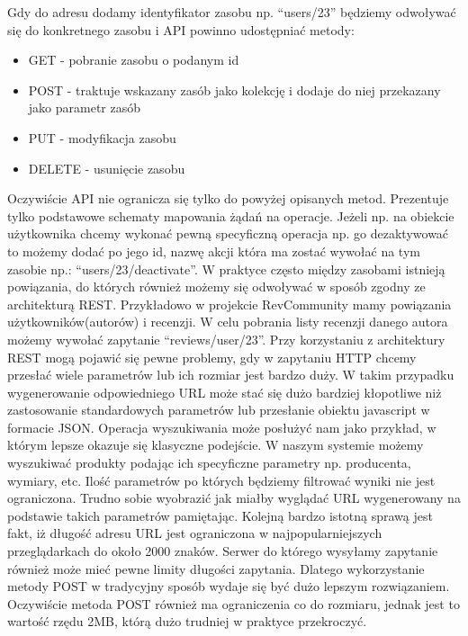 Gdy do adresu dodamy identyfikator zasobu np. “users/23” będziemy odwoływać się do konkretnego zasobu i API powinno udostępniać metody:

\begin{itemize}
\item GET - pobranie zasobu o podanym id
\item POST - traktuje wskazany zasób jako kolekcję i dodaje do niej przekazany jako parametr zasób
\item PUT - modyfikacja zasobu
\item DELETE - usunięcie zasobu
\end{itemize}

Oczywiście API nie ogranicza się tylko do powyżej opisanych metod. Prezentuje tylko podstawowe schematy mapowania żądań na operacje. Jeżeli np. na obiekcie użytkownika chcemy wykonać pewną specyficzną operacja np. go dezaktywować to możemy dodać po jego id, nazwę akcji która ma zostać wywołać na tym zasobie np.: “users/23/deactivate”. 
W praktyce często między zasobami istnieją powiązania, do których również możemy się odwoływać w sposób zgodny ze architekturą REST. Przykładowo w projekcie RevCommunity mamy powiązania użytkowników(autorów) i recenzji. W celu pobrania listy recenzji danego autora możemy wywołać zapytanie “reviews/user/23”.
Przy korzystaniu z architektury REST mogą pojawić się pewne problemy, gdy w zapytaniu HTTP chcemy przesłać wiele parametrów lub ich rozmiar jest bardzo duży. W takim przypadku wygenerowanie odpowiedniego URL może stać się dużo bardziej kłopotliwe niż zastosowanie standardowych parametrów lub przesłanie obiektu javascript w formacie JSON. Operacja wyszukiwania może posłużyć nam jako przykład, w którym lepsze okazuje się klasyczne podejście. W naszym systemie możemy wyszukiwać produkty podając ich specyficzne parametry np. producenta, wymiary, etc. Ilość parametrów po których będziemy filtrować wyniki nie jest ograniczona. Trudno sobie wyobrazić jak miałby wyglądać URL wygenerowany na podstawie takich parametrów pamiętając. Kolejną bardzo istotną sprawą jest fakt, iż długość adresu URL jest ograniczona w najpopularniejszych przeglądarkach do około 2000 znaków. Serwer do którego wysyłamy zapytanie również może mieć pewne limity długości zapytania. Dlatego wykorzystanie metody POST w tradycyjny sposób wydaje się być dużo lepszym rozwiązaniem. Oczywiście metoda POST również ma ograniczenia co do rozmiaru, jednak jest to wartość rzędu 2MB, którą dużo trudniej w praktyce przekroczyć.

